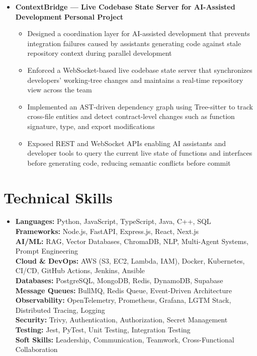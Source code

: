 \documentclass[letterpaper,10pt]{article}
\newcommand{\resumeItem}[1]{\item \small{#1}}
\newcommand{\resumeProjectHeading}[2]{
\item
\small #1 \hfill \textbf{\small #2}
\vspace{-4pt}
}
\begin{document}
\begin{itemize}[leftmargin=0in, label={}]
\vspace{5pt}

\resumeProjectHeading
{\textbf{ContextBridge — Live Codebase State Server for AI-Assisted Development}}{Personal Project}
\begin{itemize}
\resumeItem{Designed a coordination layer for AI-assisted development that prevents integration failures caused by assistants generating code against stale repository context during parallel development}
\resumeItem{Enforced a WebSocket-based live codebase state server that synchronizes developers’ working-tree changes and maintains a real-time repository view across the team}
\resumeItem{Implemented an AST-driven dependency graph using Tree-sitter to track cross-file entities and detect contract-level changes such as function signature, type, and export modifications}
\resumeItem{Exposed REST and WebSocket APIs enabling AI assistants and developer tools to query the current live state of functions and interfaces before generating code, reducing semantic conflicts before commit}
\end{itemize}

\end{itemize}

\vspace{-6pt}
\section{Technical Skills}
\begin{itemize}[leftmargin=*]
\item \textbf{Languages:} Python, JavaScript, TypeScript, Java, C++, SQL \\
\textbf{Frameworks:} Node.js, FastAPI, Express.js, React, Next.js \\
\textbf{AI/ML:} RAG, Vector Databases, ChromaDB, NLP, Multi-Agent Systems, Prompt Engineering \\
\textbf{Cloud \& DevOps:} AWS (S3, EC2, Lambda, IAM), Docker, Kubernetes, CI/CD, GitHub Actions, Jenkins, Ansible \\
\textbf{Databases:} PostgreSQL, MongoDB, Redis, DynamoDB, Supabase \\
\textbf{Message Queues:} BullMQ, Redis Queue, Event-Driven Architecture \\
\textbf{Observability:} OpenTelemetry, Prometheus, Grafana, LGTM Stack, Distributed Tracing, Logging \\
\textbf{Security:} Trivy, Authentication, Authorization, Secret Management \\
\textbf{Testing:} Jest, PyTest, Unit Testing, Integration Testing \\
\textbf{Soft Skills:} Leadership, Communication, Teamwork, Cross-Functional Collaboration
\end{itemize}
\end{document}
